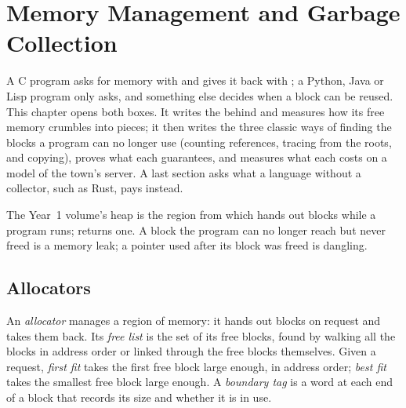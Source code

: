 \chapter{Memory Management and Garbage Collection}\label{ch:b3:garbage-collection}

A C program asks for memory with  and gives it back with ; a Python, Java or Lisp program only asks, and something else decides when a block can be reused. This chapter opens both boxes. It writes the  behind  and measures how its free memory crumbles into pieces; it then writes the three classic ways of finding the blocks a program can no longer use (counting references, tracing from the roots, and copying), proves what each guarantees, and measures what each costs on a model of the town's server. A last section asks what a language without a collector, such as Rust, pays instead.

\begin{recall}
The Year~1 volume's heap is the region from which  hands out blocks while a program runs;  returns one. A block the program can no longer reach but never freed is a memory leak; a pointer used after its block was freed is dangling.
\end{recall}


\section{Allocators}\label{sec:b3:garbage-collection:allocators}

\begin{definition}\label{def:b3:garbage-collection:allocator}
An \emph{allocator} manages a region of memory: it hands out blocks on request and takes them back. Its \emph{free list} is the set of its free blocks, found by walking all the blocks in address order or linked through the free blocks themselves. Given a request, \emph{first fit} takes the first free block large enough, in address order; \emph{best fit} takes the smallest free block large enough. A \emph{boundary tag} is a word at each end of a block that records its size and whether it is in use.
\end{definition}

